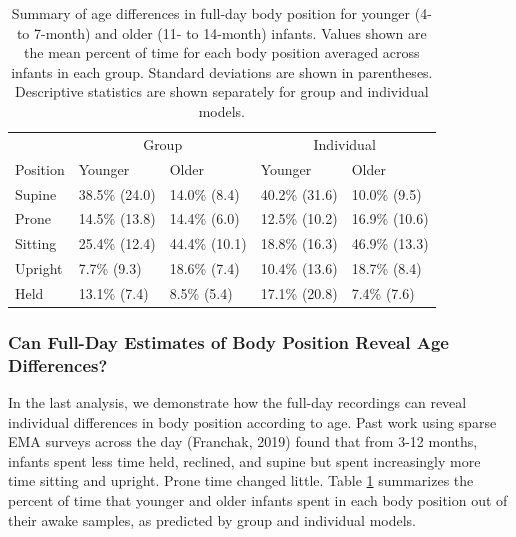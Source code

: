 \documentclass[
  man]{apa6}
\begin{document}
\begin{table}[tbp]

\begin{center}
\begin{threeparttable}

\caption{\label{tab:agetable}Summary of age differences in full-day body position for younger (4- to 7-month) and older (11- to 14-month) infants. Values shown are the mean percent of time for each body position averaged across infants in each group. Standard deviations are shown in parentheses. Descriptive statistics are shown separately for group and individual models.}

\begin{tabular}{lllll}
\toprule
 & \multicolumn{2}{c}{Group} & \multicolumn{2}{c}{Individual} \\
\cmidrule(r){2-3} \cmidrule(r){4-5}
Position & Younger & Older & Younger & Older\\
\midrule
Supine & 38.5\% (24.0) & 14.0\% (8.4) & 40.2\% (31.6) & 10.0\% (9.5)\\
Prone & 14.5\% (13.8) & 14.4\% (6.0) & 12.5\% (10.2) & 16.9\% (10.6)\\
Sitting & 25.4\% (12.4) & 44.4\% (10.1) & 18.8\% (16.3) & 46.9\% (13.3)\\
Upright & 7.7\% (9.3) & 18.6\% (7.4) & 10.4\% (13.6) & 18.7\% (8.4)\\
Held & 13.1\% (7.4) & 8.5\% (5.4) & 17.1\% (20.8) & 7.4\% (7.6)\\
\bottomrule
\end{tabular}

\end{threeparttable}
\end{center}

\end{table}

\hypertarget{can-full-day-estimates-of-body-position-reveal-age-differences}{%
\subsubsection{Can Full-Day Estimates of Body Position Reveal Age Differences?}\label{can-full-day-estimates-of-body-position-reveal-age-differences}}

In the last analysis, we demonstrate how the full-day recordings can reveal individual differences in body position according to age. Past work using sparse EMA surveys across the day (Franchak, 2019) found that from 3-12 months, infants spent less time held, reclined, and supine but spent increasingly more time sitting and upright. Prone time changed little. Table \ref{tab:agetable} summarizes the percent of time that younger and older infants spent in each body position out of their awake samples, as predicted by group and individual models.
\end{document}

